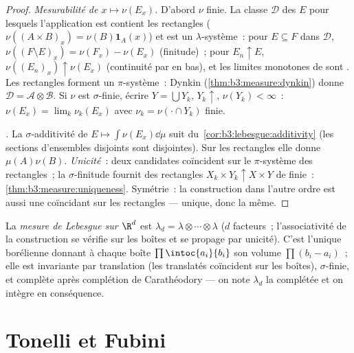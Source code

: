 \begin{proof}
\emph{Mesurabilité de $x \mapsto \nu(E_x)$.} D'abord $\nu$
finie. La classe $\mathcal D$ des $E$ pour lesquels l'application
est  contient les rectangles ($\nu((A\times B)_x) =
\nu(B)\mathbf 1_A(x)$) et est un $\lambda$-système~: pour $E
\subseteq F$ dans $\mathcal D$, $\nu((F\setminus E)_x) =
\nu(F_x) - \nu(E_x)$ (finitude)~; pour $E_n \uparrow E$,
$\nu((E_n)_x) \uparrow \nu(E_x)$ (continuité par en bas), et
les limites monotones de  sont .
Les rectangles forment un $\pi$-système~: Dynkin
(\cref{thm:b3:measure:dynkin}) donne $\mathcal D = \mathcal
A\otimes\mathcal B$. Si $\nu$ est $\sigma$-finie, écrire $Y =
\bigcup Y_k$, $Y_k \uparrow$, $\nu(Y_k) < \infty$~:
$\nu(E_x) = \lim_k\nu_k(E_x)$ avec $\nu_k = \nu(\cdot\cap Y_k)$
finie.

\emph{.} La $\sigma$-additivité de $E \mapsto
\int\nu(E_x)\dd\mu$ suit du~\cref{cor:b3:lebesgue:additivity}
(les sections d'ensembles disjoints sont disjointes). Sur les
rectangles elle donne $\mu(A)\nu(B)$. \emph{Unicité}~: deux
candidates coïncident sur le $\pi$-système des rectangles~; la
$\sigma$-finitude fournit des rectangles $X_k\times Y_k
\uparrow X\times Y$ de  finie~:
\cref{thm:b3:measure:uniqueness}. Symétrie~: la construction
dans l'autre ordre est aussi une  coïncidant sur les
rectangles --- unique, donc la même.
\end{proof}

\begin{definition}\label{def:b3:product:lebesgue}
La \emph{mesure de Lebesgue sur $\R^d$} est $\lambda_d = \lambda\otimes\cdots\otimes\lambda$
($d$ facteurs~; l'associativité de la construction se vérifie
sur les boîtes et se propage par unicité). C'est l'unique 
borélienne donnant à chaque boîte $\prod\intoc{a_i}{b_i}$ son
volume $\prod(b_i - a_i)$~; elle est invariante par translation
(les translatés coïncident sur les boîtes), $\sigma$-finie, et
complète après complétion de Carathéodory --- on note
$\lambda_d$ la  complétée et on intègre en conséquence.
\end{definition}

\section{Tonelli et Fubini}

